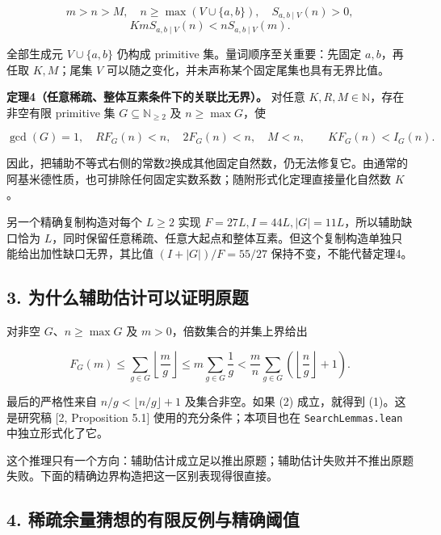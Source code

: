 \documentclass[
  11pt,
]{article}
\begin{document}
\[
m>n>M,\quad n\ge\max(V\cup\{a,b\}),\quad S_{a,b\mid V}(n)>0,
\] \[
K m S_{a,b\mid V}(n)<nS_{a,b\mid V}(m). \tag{4}
\]

全部生成元 \(V\cup\{a,b\}\) 仍构成 primitive
集。量词顺序至关重要：先固定 \(a,b\)，再任取 \(K,M\)；尾集 \(V\)
可以随之变化，并未声称某个固定尾集也具有无界比值。

\textbf{定理4（任意稀疏、整体互素条件下的关联比无界）。} 对任意
\(K,R,M\in\mathbb N\)，存在非空有限 primitive 集
\(G\subseteq\mathbb N_{\ge2}\) 及 \(n\ge\max G\)，使

\[
\gcd(G)=1,\quad RF_G(n)<n,\quad 2F_G(n)<n,\quad M<n,
\qquad KF_G(n)<I_G(n). \tag{5}
\]

因此，把辅助不等式右侧的常数2换成其他固定自然数，仍无法修复它。由通常的阿基米德性质，也可排除任何固定实数系数；随附形式化定理直接量化自然数
\(K\)。

另一个精确复制构造对每个 \(L\ge2\) 实现
\(F=27L,I=44L,|G|=11L\)，所以辅助缺口恰为
\(L\)，同时保留任意稀疏、任意大起点和整体互素。但这个复制构造单独只能给出加性缺口无界，其比值
\((I+|G|)/F=55/27\) 保持不变，不能代替定理4。

\hypertarget{ux4e3aux4ec0ux4e48ux8f85ux52a9ux4f30ux8ba1ux53efux4ee5ux8bc1ux660eux539fux9898}{%
\subsection{3.
为什么辅助估计可以证明原题}\label{ux4e3aux4ec0ux4e48ux8f85ux52a9ux4f30ux8ba1ux53efux4ee5ux8bc1ux660eux539fux9898}}

对非空 \(G\)、\(n\ge\max G\) 及 \(m>0\)，倍数集合的并集上界给出

\[
F_G(m)\le\sum_{g\in G}\left\lfloor\frac mg\right\rfloor
\le m\sum_{g\in G}\frac1g
<\frac mn\sum_{g\in G}\left(\left\lfloor\frac ng\right\rfloor+1\right).
\]

最后的严格性来自 \(n/g<\lfloor n/g\rfloor+1\) 及集合非空。如果 (2)
成立，就得到 (1)。这是研究稿 {[}2, Proposition 5.1{]}
使用的充分条件；本项目也在 \texttt{SearchLemmas.\allowbreak{}lean} 中独立形式化了它。

这个推理只有一个方向：辅助估计成立足以推出原题；辅助估计失败并不推出原题失败。下面的精确边界构造把这一区别表现得很直接。

\hypertarget{ux7a00ux758fux4f59ux91cfux731cux60f3ux7684ux6709ux9650ux53cdux4f8bux4e0eux7cbeux786eux9608ux503c}{%
\subsection{4.
稀疏余量猜想的有限反例与精确阈值}\label{ux7a00ux758fux4f59ux91cfux731cux60f3ux7684ux6709ux9650ux53cdux4f8bux4e0eux7cbeux786eux9608ux503c}}
\end{document}
